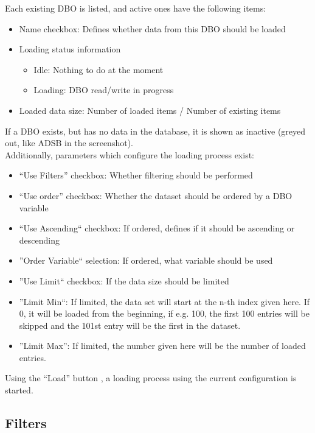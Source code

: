 \documentclass[10pt,letterpaper,extrafontsizes]{memoir}
\begin{document}
Each existing DBO is listed, and active ones have the following items:

\begin{itemize}
 \item Name checkbox: Defines whether data from this DBO should be loaded
 \item Loading status information
  \begin{itemize}
  \item Idle: Nothing to do at the moment
  \item Loading: DBO read/write in progress
  \end{itemize}
 \item Loaded data size: Number of loaded items / Number of existing items
\end{itemize}

If a DBO exists, but has no data in the database, it is shown as inactive (greyed out, like ADSB in the screenshot).\\

Additionally, parameters which configure the loading process exist:

\begin{itemize}
 \item ``Use Filters'' checkbox: Whether filtering should be performed
 \item ``Use order'' checkbox: Whether the dataset should be ordered by a DBO variable
 \item ``Use Ascending`` checkbox: If ordered, defines if it should be ascending or descending
 \item ''Order Variable`` selection: If ordered, what variable should be used
 \item ''Use Limit`` checkbox: If the data size should be limited
 \item ''Limit Min``: If limited, the data set will start at the n-th index given here. If 0, it will be loaded from the beginning, if e.g. 100, the first 100 entries will be skipped and the 101st entry will be the first in the dataset.
\item ''Limit Max'': If limited, the number given here will be the number of loaded entries.
\end{itemize}

Using the ``Load'' button , a loading process using the current configuration is started.

\subsection{Filters}
\end{document}
